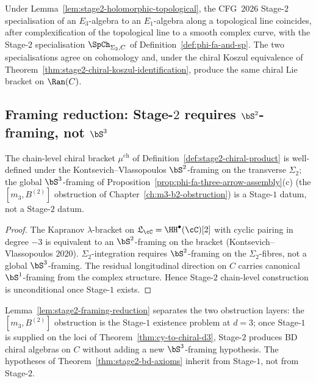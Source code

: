 \begin{corollary}
\label{cor:stage2-cfg-equals-vol3}
Under Lemma~\ref{lem:stage2-holomorphic-topological}, the CFG~$2026$ Stage-$2$ specialisation of an $E_3$-algebra to an $E_1$-algebra along a topological line coincides, after complexification of the topological line to a smooth complex curve, with the Stage-$2$ specialisation $\SpCh_{\Sigma_2,C}$ of Definition~\ref{def:phi-fa-and-sp}. The two specialisations agree on cohomology and, under the chiral Koszul equivalence of Theorem~\ref{thm:stage2-chiral-koszul-identification}, produce the same chiral Lie bracket on $\Ran(C)$.
\end{corollary}

\subsection{Framing reduction: Stage-$2$ requires \texorpdfstring{$\bS^2$}{S-2}-framing, not \texorpdfstring{$\bS^3$}{S-3}}
\label{subsec:stage2-framing-reduction}

\begin{lemma}
\label{lem:stage2-framing-reduction}
The chain-level chiral bracket $\mu^{\mathrm{ch}}$ of Definition~\ref{def:stage2-chiral-product} is well-defined under the Kontsevich--Vlassopoulos $\bS^2$-framing on the transverse $\Sigma_2$; the global $\bS^3$-framing of Proposition~\ref{prop:phi-fa-three-arrow-assembly}(c) (the $[m_3,B^{(2)}]$ obstruction of Chapter~\ref{ch:m3-b2-obstruction}) is a Stage-$1$ datum, not a Stage-$2$ datum.
\end{lemma}

\begin{proof}
The Kapranov $\lambda$-bracket on $\mathfrak{L}_\cC=\HH^\bullet(\cC)[2]$ with cyclic pairing in degree $-3$ is equivalent to an $\bS^2$-framing on the bracket (Kontsevich--Vlassopoulos $2020$). $\Sigma_2$-integration requires $\bS^2$-framing on the $\Sigma_2$-fibres, not a global $\bS^3$-framing. The residual longitudinal direction on $C$ carries canonical $\bS^1$-framing from the complex structure. Hence Stage-$2$ chain-level construction is unconditional once Stage-$1$ exists.
\end{proof}

\begin{remark}
\label{rem:stage2-unconditional-given-stage1}
Lemma~\ref{lem:stage2-framing-reduction} separates the two obstruction layers: the $[m_3,B^{(2)}]$ obstruction is the Stage-$1$ existence problem at $d=3$; once Stage-$1$ is supplied on the loci of Theorem~\ref{thm:cy-to-chiral-d3}, Stage-$2$ produces BD chiral algebras on $C$ without adding a new $\bS^3$-framing hypothesis. The hypotheses of Theorem~\ref{thm:stage2-bd-axioms} inherit from Stage-$1$, not from Stage-$2$.
\end{remark}


